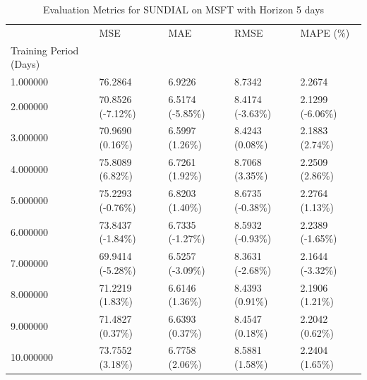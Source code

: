 \begin{table}
\caption{Evaluation Metrics for SUNDIAL on MSFT with Horizon 5 days}
\label{tab:sundial_MSFT_h5_metrics}
\begin{tabular}{lllll}
\toprule
 & MSE & MAE & RMSE & MAPE (\%) \\
Training Period (Days) &  &  &  &  \\
\midrule
1.000000 & 76.2864 & 6.9226 & 8.7342 & 2.2674 \\
2.000000 & 70.8526 (-7.12\%) & 6.5174 (-5.85\%) & 8.4174 (-3.63\%) & 2.1299 (-6.06\%) \\
3.000000 & 70.9690 (0.16\%) & 6.5997 (1.26\%) & 8.4243 (0.08\%) & 2.1883 (2.74\%) \\
4.000000 & 75.8089 (6.82\%) & 6.7261 (1.92\%) & 8.7068 (3.35\%) & 2.2509 (2.86\%) \\
5.000000 & 75.2293 (-0.76\%) & 6.8203 (1.40\%) & 8.6735 (-0.38\%) & 2.2764 (1.13\%) \\
6.000000 & 73.8437 (-1.84\%) & 6.7335 (-1.27\%) & 8.5932 (-0.93\%) & 2.2389 (-1.65\%) \\
7.000000 & 69.9414 (-5.28\%) & 6.5257 (-3.09\%) & 8.3631 (-2.68\%) & 2.1644 (-3.32\%) \\
8.000000 & 71.2219 (1.83\%) & 6.6146 (1.36\%) & 8.4393 (0.91\%) & 2.1906 (1.21\%) \\
9.000000 & 71.4827 (0.37\%) & 6.6393 (0.37\%) & 8.4547 (0.18\%) & 2.2042 (0.62\%) \\
10.000000 & 73.7552 (3.18\%) & 6.7758 (2.06\%) & 8.5881 (1.58\%) & 2.2404 (1.65\%) \\
\bottomrule
\end{tabular}
\end{table}
